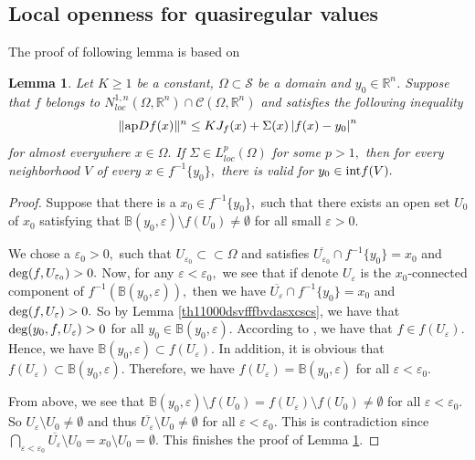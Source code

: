 \documentclass[11pt,twoside]{article}
\newtheorem{lem}[thm]{Lemma}
\theoremstyle{definition}
\theoremstyle{remark}
\newcommand{\abs}[1]{\left|#1\right|}
\begin{document}
\subsection{Local openness for quasiregular values} 
The proof of following lemma is based on \cite[Lemma 6.3]{KO222}
\begin{lem}\label{txcsh11000dsvfffbvdasxcscc ssc s}
Let $K\geq1$ be a constant, $\Omega\subset\mathcal{S}$ be a domain and $y_{0}\in\mathbb{R}^{n}$. Suppose that $f$ belongs to  $N_{loc}^{1,n}(\Omega,\mathbb{R}^{n})\cap \mathcal{C}(\Omega,\mathbb{R}^{n})$ and satisfies the following inequality
\begin{equation}
\| {\rm ap}Df(x)\|^{n}\leq KJ_{f}(x)+\Sigma(x)\abs{f(x)-y_{0}}^{n}
\end{equation}
for almost everywhere $x\in\Omega.$ If $\Sigma\in L_{loc}^{p}(\Omega)$ for some $p>1,$ then for every neighborhood $V$ of every  $x\in f^{-1}\{y_{0}\},$  there is valid for $y_{0}\in {\rm int}f(V).$
\end{lem}
\begin{proof}
Suppose that there is a $x_{0}\in f^{-1}\{y_{0}\},$ such that there exists an open set $U_{0}$ of $x_{0}$ satisfying that $\mathbb{B}(y_{0},\varepsilon)\setminus f(U_{0})\neq\emptyset$ for all small $\varepsilon>0.$

We chose a $\varepsilon_{0}>0,$ such that $U_{\varepsilon_{0}}\subset\subset\Omega$ and satisfies $\overline{U_{\varepsilon_{0}}}\cap f^{-1}\{y_{0}\}=x_{0}$ and ${\rm deg}(f,U_{\varepsilon_{0}})>0.$
Now, for any $\varepsilon<\varepsilon_{0},$ we see that if denote $U_{\varepsilon}$ is the $x_{0}$-connected component of $f^{-1}(\mathbb{B}(y_{0},\varepsilon)),$ then we have 
$\overline{U_{\varepsilon}}\cap f^{-1}\{y_{0}\}=x_{0}$ and ${\rm deg}(f,U_{\varepsilon})>0.$ So by Lemma \ref{th11000dsvfffbvdasxcscs}, we have that  ${\rm deg}(y_{0}, f,U_{\varepsilon})>0$ for all 
$y_{0}\in\mathbb{B}(y_{0},\varepsilon).$ According to \cite[Lemma 2.7]{Kir16}, we have that $f\in f(U_{\varepsilon}).$ Hence, we have $\mathbb{B}(y_{0},\varepsilon)\subset f(U_{\varepsilon}).$
In addition, it is obvious that  $ f(U_{\varepsilon})\subset\mathbb{B}(y_{0},\varepsilon).$ Therefore, we have $f(U_{\varepsilon})=\mathbb{B}(y_{0},\varepsilon)$ for all
$\varepsilon<\varepsilon_{0}.$

From above, we see that $\mathbb{B}(y_{0},\varepsilon)\setminus f(U_{0})=f(U_{\varepsilon})\setminus f(U_{0})\neq\emptyset$ for all $\varepsilon<\varepsilon_{0}.$
So $U_{\varepsilon}\setminus U_{0}\neq\emptyset$ and thus $\overline{U_{\varepsilon}}\setminus U_{0}\neq\emptyset$ for all $\varepsilon<\varepsilon_{0}.$ This is contradiction since
$\bigcap_{\varepsilon<\varepsilon_{0}}\overline{U_{\varepsilon}}\setminus U_{0}=x_{0}\setminus U_{0}=\emptyset.$ This finishes the proof of Lemma \ref{txcsh11000dsvfffbvdasxcscc ssc s}.
\end{proof}
\end{document}
